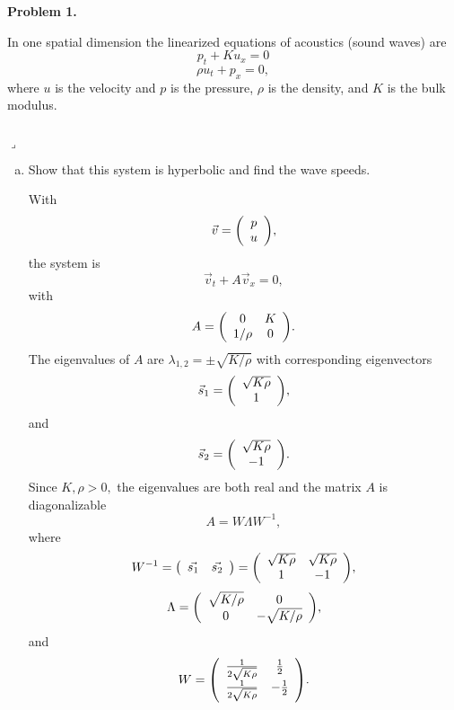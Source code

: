 \documentclass[12pt]{article}
\newenvironment{myprob}[1]
    {%
    \noindent{\Huge$\ulcorner$}\textbf{#1.}\begin{em}
    }
    { 
    \end{em} \\ \hphantom{l} \hfill {\Huge$\lrcorner$} }
\begin{document}
\rhead{\today}

{\let\newpage\relax} 


\begin{myprob}{Problem 1}
In one spatial dimension the linearized equations of acoustics (sound waves) are
$$p_t + K u_x = 0 $$
$$\rho u_t + p_x =0,$$
where $u$ is the velocity and $p$ is the pressure, $\rho$ is the density, and $K$ is the bulk modulus.
\end{myprob}
\begin{enumerate}[(a)]
\item Show that this system is hyperbolic and find the wave speeds.

With $$\vec{v} = \qty(\begin{array}{c} p \\ u \end{array}),$$
the system is $$\vec{v}_t + A\vec{v}_x = 0,$$
with $$A = \qty(\begin{array}{cc} 0 & K \\ 1/\rho & 0 \end{array}).$$
The eigenvalues of $A$ are $\lambda_{1,2}=\pm \sqrt{K/\rho}$ with corresponding eigenvectors $$\vec{s}_1 = \qty(\begin{array}{c} \sqrt{K\rho} \\ 1 \end{array}),$$
and $$\vec{s}_2 = \qty(\begin{array}{c} \sqrt{K\rho} \\ -1 \end{array}).$$
Since $K, \rho >0,$ the eigenvalues are both real and the matrix $A$ is diagonalizable
$$ A = W\Lambda W^{-1},$$
where $$W^{-1} = \qty(\begin{array}{cc} \vec{s_1} & \vec{s_2} \end{array}) = \qty(\begin{array}{cc} \sqrt{K\rho} & \sqrt{K\rho} \\ 1 & -1 \end{array}),$$
$$ \Lambda = \qty(\begin{array}{cc} \sqrt{K/\rho} & 0 \\ 0 & -\sqrt{K/\rho} \end{array}),$$
and $$ W = \qty(\begin{array}{cc} \frac{1}{2\sqrt{K\rho}} & \frac{1}{2} \\ \frac{1}{2\sqrt{K\rho}} & -\frac{1}{2} \end{array}).$$

\end{enumerate}
\end{document}
